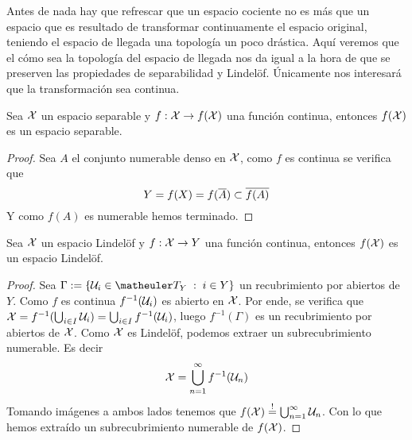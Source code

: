 Antes de nada hay que refrescar que un espacio cociente no es más que un espacio que es resultado de transformar continuamente el espacio original, teniendo el espacio de llegada una topología un poco drástica. Aquí veremos que el cómo sea la topología del espacio de llegada nos da igual a la hora de que se preserven las propiedades de separabilidad y Lindelöf. Únicamente nos interesará que la transformación sea continua.
\begin{prop}
	Sea $\mathcal{X}$ un espacio separable y $f:\mathcal{X}\to f(\mathcal{X})$ una función continua, entonces $f(\mathcal{X})$ es un espacio separable.
\end{prop}
\begin{proof}
	Sea $A$ el conjunto numerable denso en $\mathcal{X}$, como $f$ es continua se verifica que
	\begin{equation*}
		Y=f(X)=f(\overline{A})\subset\overline{f(A)}
	\end{equation*}
	Y como $f(A)$ es numerable hemos terminado.
\end{proof}
\begin{prop}
	\label{sep_prop_lindelofContLindelof}
	Sea $\mathcal{X}$ un espacio Lindelöf y $f:\mathcal{X}\to Y$ una función continua, entonces $f(\mathcal{X})$ es un espacio Lindelöf.
\end{prop}
\begin{proof}
	Sea $\Gamma:=\{\U_i\in\T_Y\midc i\in Y\}$ un recubrimiento por abiertos de $Y$. Como $f$ es continua $f^{-1}(\mathcal{U}_i)$ es abierto en $\mathcal{X}$. Por ende, se verifica que $\mathcal{X} = f^{-1}(\bigcup_{i\in I}\mathcal{U}_i)=\bigcup_{i\in I} f^{-1}(\mathcal{U}_i)$, luego $f^{-1}(\Gamma)$ es un recubrimiento por abiertos de $\mathcal{X}$. Como $\mathcal{X}$ es Lindelöf, podemos extraer un subrecubrimiento numerable. Es decir
	\begin{equation*}
		\mathcal{X}=\bigcup_{n=1}^{\infty}f^{-1}(\mathcal{U}_n)
	\end{equation*}
	Tomando imágenes a ambos lados tenemos que $f(\mathcal{X})\stackrel{!}{=}\bigcup_{n=1}^{\infty}\mathcal{U}_n$. Con lo que hemos extraído un subrecubrimiento numerable de $f(\mathcal{X})$.
\end{proof}
